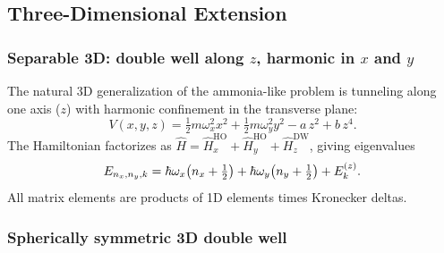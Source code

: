 \subsection{Three-Dimensional Extension}\label{sec:3d_ext}

\subsubsection{Separable 3D: double well along $z$, harmonic in $x$ and $y$}

The natural 3D generalization of the ammonia-like problem is tunneling along
one axis ($z$) with harmonic confinement in the transverse plane:
\begin{equation}\label{eq:V_sep_3d}
    V(x,y,z) = \tfrac{1}{2}m\omega_x^2 x^2 + \tfrac{1}{2}m\omega_y^2 y^2
    - a\,z^2 + b\,z^4.
\end{equation}
The Hamiltonian factorizes as
$\hat{H} = \hat{H}_x^\mathrm{HO} + \hat{H}_y^\mathrm{HO} + \hat{H}_z^\mathrm{DW}$,
giving eigenvalues
\begin{equation}
    E_{n_x,n_y,k} = \hbar\omega_x\!\left(n_x + \tfrac{1}{2}\right)
    + \hbar\omega_y\!\left(n_y + \tfrac{1}{2}\right) + E_k^{(z)}.
\end{equation}
All matrix elements are products of 1D elements times Kronecker deltas.

\subsubsection{Spherically symmetric 3D double well}

